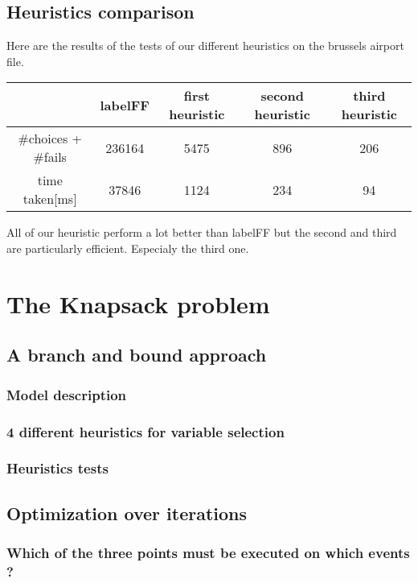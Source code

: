 \documentclass{eplDoc}
\begin{document}
\subsection{Heuristics comparison} %
Here are the results of the tests of our different heuristics on the brussels airport file. 
\begin{table}[h]
	\centering
		\begin{tabular}{|c|cccc|}
			\hline
			  & labelFF & first heuristic & second heuristic & third heuristic \\ 
			  \hline
			\#choices + \#fails &   236164 & 5475 & 896 & 206 \\ 
			time taken[ms] & 37846 & 1124 & 234 & 94 \\ 
			\hline
			
		\end{tabular}
\end{table}

All of our heuristic perform a lot better than labelFF but the second and third are particularly efficient. Especialy the third one.

\section{The Knapsack problem}
\subsection{A branch and bound approach} %

\subsubsection{Model description}
\subsubsection{4 different heuristics for variable selection}
\subsubsection{Heuristics tests} %

\subsection{Optimization over iterations} %
\subsubsection{Which of the three points must be executed on which events ?}
\end{document}
